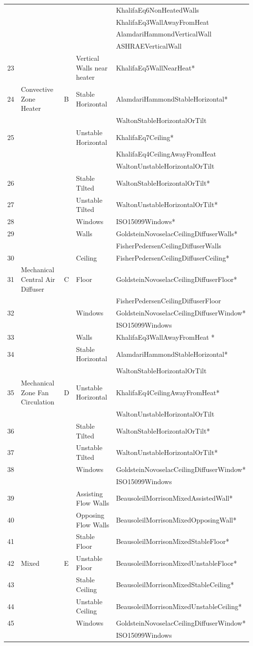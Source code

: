 {\begin{longtable}[c]{p{0.25in}p{1.25in}p{0.25in}p{1.5in}p{2.5in}}
 & & & & KhalifaEq6NonHeatedWalls \tabularnewline
 & & & & KhalifaEq3WallAwayFromHeat \tabularnewline
 & & & & AlamdariHammondVerticalWall \tabularnewline
 & & & & ASHRAEVerticalWall \tabularnewline
23 & & & Vertical Walls near heater & KhalifaEq5WallNearHeat* \tabularnewline
24 & Convective Zone Heater & B & Stable Horizontal & AlamdariHammondStableHorizontal* \tabularnewline
 & & & & WaltonStableHorizontalOrTilt \tabularnewline
25 & & & Unstable Horizontal & KhalifaEq7Ceiling* \tabularnewline
 & & & & KhalifaEq4CeilingAwayFromHeat \tabularnewline
 & & & & WaltonUnstableHorizontalOrTilt \tabularnewline
26 & & & Stable Tilted & WaltonStableHorizontalOrTilt* \tabularnewline
27 & & & Unstable Tilted & WaltonUnstableHorizontalOrTilt* \tabularnewline
28 & & & Windows & ISO15099Windows* \tabularnewline
\midrule
29 & & & Walls & GoldsteinNovoselacCeilingDiffuserWalls* \tabularnewline
 & & & & FisherPedersenCeilingDiffuserWalls \tabularnewline
30 & & & Ceiling & FisherPedersenCeilingDiffuserCeiling* \tabularnewline
31 & Mechanical Central Air Diffuser & C & Floor & GoldsteinNovoselacCeilingDiffuserFloor* \tabularnewline
 & & & & FisherPedersenCeilingDiffuserFloor \tabularnewline
32 & & & Windows & GoldsteinNovoselacCeilingDiffuserWindow* \tabularnewline
 & & & & ISO15099Windows \tabularnewline
\midrule
33 & & & Walls & KhalifaEq3WallAwayFromHeat * \tabularnewline
34 & & & Stable Horizontal & AlamdariHammondStableHorizontal* \tabularnewline
 & & & & WaltonStableHorizontalOrTilt \tabularnewline
35 & Mechanical Zone Fan Circulation & D & Unstable Horizontal & KhalifaEq4CeilingAwayFromHeat* \tabularnewline
 & & & & WaltonUnstableHorizontalOrTilt \tabularnewline
36 & & & Stable Tilted & WaltonStableHorizontalOrTilt* \tabularnewline
37 & & & Unstable Tilted & WaltonUnstableHorizontalOrTilt* \tabularnewline
38 & & & Windows & GoldsteinNovoselacCeilingDiffuserWindow* \tabularnewline
 & & & & ISO15099Windows \tabularnewline
\midrule
39 & & & Assisting Flow Walls & BeausoleilMorrisonMixedAssistedWall* \tabularnewline
40 & & & Opposing Flow Walls & BeausoleilMorrisonMixedOpposingWall* \tabularnewline
41 & & & Stable Floor & BeausoleilMorrisonMixedStableFloor* \tabularnewline
42 & Mixed & E & Unstable Floor & BeausoleilMorrisonMixedUnstableFloor* \tabularnewline
43 & & & Stable Ceiling & BeausoleilMorrisonMixedStableCeiling* \tabularnewline
44 & & & Unstable Ceiling & BeausoleilMorrisonMixedUnstableCeiling* \tabularnewline
45 & & & Windows & GoldsteinNovoselacCeilingDiffuserWindow* \tabularnewline
 & & & & ISO15099Windows \tabularnewline
\bottomrule
\end{longtable}}

